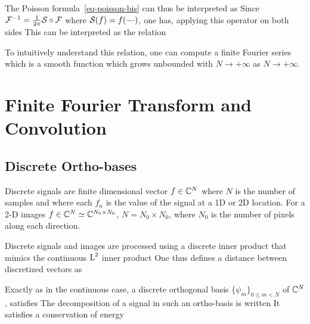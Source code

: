 The Poisson formula~\eqref{eq-poisson-bis} can thus be interpreted as
Since $\mathcal{F}^{-1} = \frac{1}{2\pi} \mathcal{S} \circ \mathcal{F}$ where $\mathcal{S}(f)=f(-\cdot)$, one has, applying this operator on both sides
This can be interpreted as the relation

To intuitively understand this relation, one can compute a finite Fourier series
which is a smooth function which grows unbounded with $N \rightarrow +\infty$ as $N \rightarrow +\infty$. 

\section{Finite Fourier Transform and Convolution}
\label{sec-dft}

\subsection{Discrete Ortho-bases}

Discrete signals are finite dimensional vector $f \in \mathbb{C}^N$ where $N$ is the number of samples and where each $f_n$ is the value of the signal at a 1D or 2D location. For a 2-D images $f \in \mathbb{C}^N \simeq \mathbb{C}^{N_0 \times N_0}$, $N = N_0 \times N_0$, where $N_0$ is the number of pixels along each direction.

Discrete signals and images are processed using a discrete inner product that mimics the continuous $\text{\upshape L}^2$ inner product
One thus defines a distance between discretized vectors as

Exactly as in the continuous case, a discrete orthogonal basis $\{ \psi_m \}_{0 \leq m < N }$ of $\mathbb{C}^N$, satisfies
The decomposition of a signal in such an ortho-basis is written
It satisfies a conservation of energy

